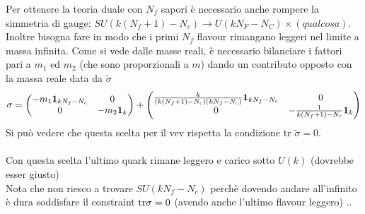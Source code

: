 \documentclass[a4paper,12pt]{article}
\begin{document}
Per ottenere la teoria duale con $N_f$ sapori è necessario anche rompere la simmetria di gauge: $SU(k(N_f+1) -N_c) \rightarrow U( k N_F - N_C) \times (qualcosa)$. Inoltre bisogna fare in modo che i primi $N_f$ flavour rimangano leggeri nel limite a massa infinita. Come si vede dalle masse reali, è necessario bilanciare i fattori pari a $m_1$ ed $m_2$ (che sono proporzionali a $m$) dando un contributo opposto con la massa reale data da $\tilde{\sigma}$
\begin{equation}
 \sigma = 
 \begin{pmatrix}
  - m_1 \bold{ 1}_{ k N_f - N_c} & 0 \\
  0 &  - m_2 \bold{ 1}_{k}
 \end{pmatrix}
+
\begin{pmatrix}
   \frac{k}{( k(N_f+1)-N_c)( k N_f - N_c)} \bold{ 1}_{ k N_f - N_c} & 0 \\
  0 &  - \frac{1}{ k(N_f+1)-N_c} \bold{ 1}_{k}

\end{pmatrix}
\end{equation}
Si può vedere che questa scelta per il vev rispetta la condizione tr $\tilde{\sigma} = 0$.\\\\
Con questa scelta l'ultimo quark rimane leggero e carico sotto $U(k)$ (dovrebbe esser giusto)\\
Nota che non riesco a trovare $SU( k N_f - N_c)$ perchè dovendo andare all'infinito è dura soddisfare il constraint $ \hbox{tr} \sigma = 0$ (avendo anche l'ultimo flavour leggero) ..\\
\end{document}
